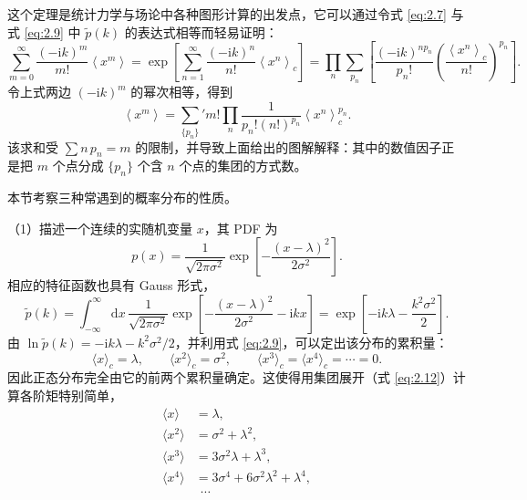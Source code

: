 这个定理是统计力学与场论中各种图形计算的出发点，它可以通过令式 \eqref{eq:2.7} 与式 \eqref{eq:2.9} 中 $\tilde p(k)$ 的表达式相等而轻易证明：
\begin{equation}\label{eq:2.13}
  \sum_{m=0}^{\infty}\frac{(-\mathrm{i}k)^m}{m!}\left\langle x^m\right\rangle=\exp\left[\sum_{n=1}^{\infty}\frac{(-\mathrm{i}k)^n}{n!}\left\langle x^n\right\rangle_c\right]=\prod_n\sum_{p_n}\left[\frac{(-\mathrm{i}k)^{np_n}}{p_n!}\left(\frac{\left\langle x^n\right\rangle_c}{n!}\right)^{p_n}\right].
\end{equation}
令上式两边 $(-\mathrm{i}k)^m$ 的幂次相等，得到
\begin{equation}\label{eq:2.14}
  \left\langle x^m\right\rangle=\sum_{\{p_n\}}'m!\prod_n\frac{1}{p_n!(n!)^{p_n}}\left\langle x^n\right\rangle_c^{p_n}.
\end{equation}
该求和受 $\sum n\,p_n=m$ 的限制，并导致上面给出的图解解释：其中的数值因子正是把 $m$ 个点分成 $\{p_n\}$ 个含 $n$ 个点的集团的方式数。


本节考察三种常遇到的概率分布的性质。

（1）描述一个连续的实随机变量 $x$，其 PDF 为
\begin{equation}\label{eq:2.15}
  p(x)=\frac{1}{\sqrt{2\pi\sigma^2}}\exp\left[-\frac{(x-\lambda)^2}{2\sigma^2}\right].
\end{equation}
相应的特征函数也具有 Gauss 形式，
\begin{equation}\label{eq:2.16}
  \tilde p(k)=\int_{-\infty}^{\infty}\mathrm{d}x\,\frac{1}{\sqrt{2\pi\sigma^2}}\exp\left[-\frac{(x-\lambda)^2}{2\sigma^2}-\mathrm{i}kx\right]=\exp\left[-\mathrm{i}k\lambda-\frac{k^2\sigma^2}{2}\right].
\end{equation}
由 $\ln\tilde p(k)=-\mathrm{i}k\lambda-k^2\sigma^2/2$，并利用式 \eqref{eq:2.9}，可以定出该分布的累积量：
\begin{equation}\label{eq:2.17}
  \langle x\rangle_c=\lambda,\qquad \langle x^2\rangle_c=\sigma^2,\qquad \langle x^3\rangle_c=\langle x^4\rangle_c=\cdots=0.
\end{equation}
因此正态分布完全由它的前两个累积量确定。这使得用集团展开（式 \eqref{eq:2.12}）计算各阶矩特别简单，
\begin{equation}\label{eq:2.18}
  \begin{aligned}
    \langle x\rangle&=\lambda,\\
    \langle x^2\rangle&=\sigma^2+\lambda^2,\\
    \langle x^3\rangle&=3\sigma^2\lambda+\lambda^3,\\
    \langle x^4\rangle&=3\sigma^4+6\sigma^2\lambda^2+\lambda^4,\\
    &\ \ \cdots
  \end{aligned}
\end{equation}

